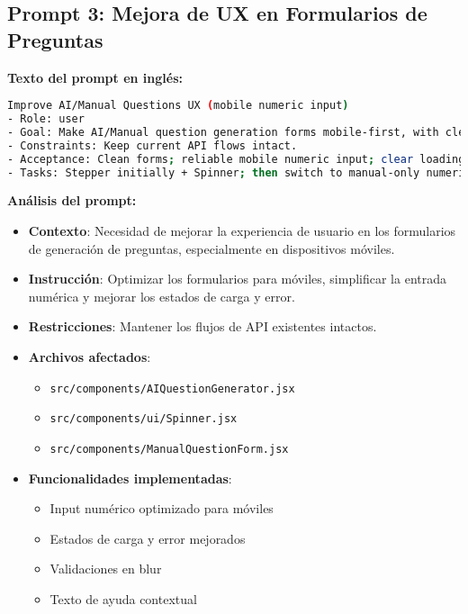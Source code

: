 \documentclass[12pt,a4paper]{article}
\begin{document}
\subsection{Prompt 3: Mejora de UX en Formularios de Preguntas}

\textbf{Texto del prompt en inglés:}
\begin{lstlisting}[language=bash]
Improve AI/Manual Questions UX (mobile numeric input)
- Role: user
- Goal: Make AI/Manual question generation forms mobile-first, with clear states and accessible focus; simplify numeric input.
- Constraints: Keep current API flows intact.
- Acceptance: Clean forms; reliable mobile numeric input; clear loading/error feedback.
- Tasks: Stepper initially + Spinner; then switch to manual-only numeric input with `inputMode="numeric"` and `pattern` filtering; empty by default; validations on blur; show helper text.
\end{lstlisting}

\textbf{Análisis del prompt:}
\begin{itemize}
    \item \textbf{Contexto}: Necesidad de mejorar la experiencia de usuario en los formularios de generación de preguntas, especialmente en dispositivos móviles.
    
    \item \textbf{Instrucción}: Optimizar los formularios para móviles, simplificar la entrada numérica y mejorar los estados de carga y error.
    
    \item \textbf{Restricciones}: Mantener los flujos de API existentes intactos.
    
    \item \textbf{Archivos afectados}:
    \begin{itemize}
        \item \texttt{src/components/AIQuestionGenerator.jsx}
        \item \texttt{src/components/ui/Spinner.jsx}
        \item \texttt{src/components/ManualQuestionForm.jsx}
    \end{itemize}
    
    \item \textbf{Funcionalidades implementadas}:
    \begin{itemize}
        \item Input numérico optimizado para móviles
        \item Estados de carga y error mejorados
        \item Validaciones en blur
        \item Texto de ayuda contextual
    \end{itemize}
\end{itemize}
\end{document}
